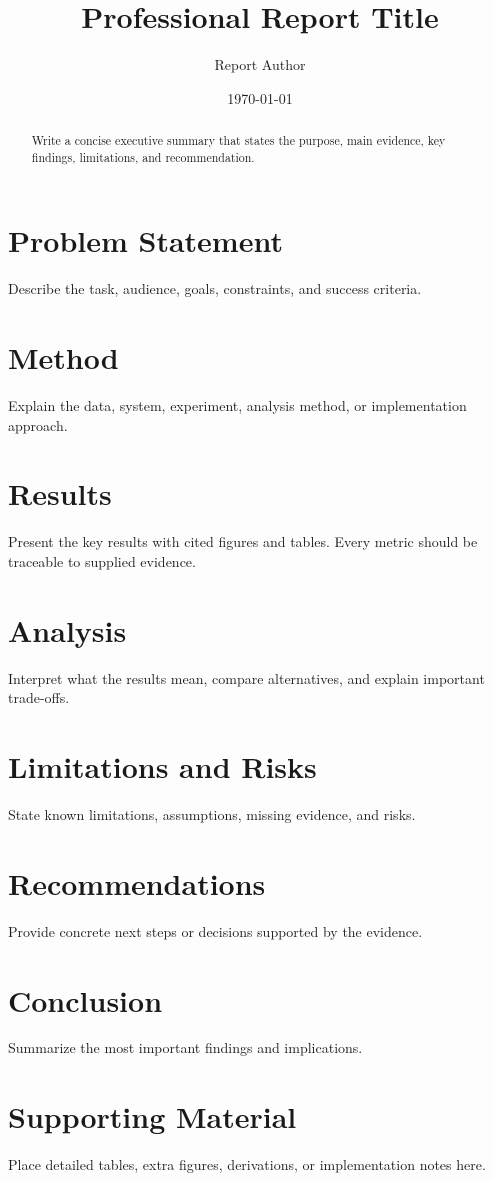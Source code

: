 \documentclass[fontsize=11pt,paper=letter,parskip=half]{scrreprt}
\title{Professional Report Title}
\author{Report Author}
\date{\today}
\begin{document}
\maketitle

\begin{abstract}
Write a concise executive summary that states the purpose, main evidence, key findings, limitations, and recommendation.
\end{abstract}

\tableofcontents

\chapter{Problem Statement}
Describe the task, audience, goals, constraints, and success criteria.

\chapter{Method}
Explain the data, system, experiment, analysis method, or implementation approach.

\chapter{Results}
Present the key results with cited figures and tables. Every metric should be traceable to supplied evidence.

\chapter{Analysis}
Interpret what the results mean, compare alternatives, and explain important trade-offs.

\chapter{Limitations and Risks}
State known limitations, assumptions, missing evidence, and risks.

\chapter{Recommendations}
Provide concrete next steps or decisions supported by the evidence.

\chapter{Conclusion}
Summarize the most important findings and implications.

\appendix
\chapter{Supporting Material}
Place detailed tables, extra figures, derivations, or implementation notes here.

% 
% 
\end{document}
